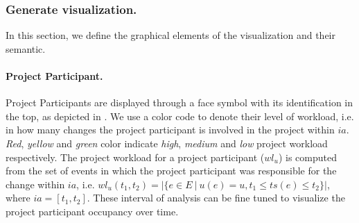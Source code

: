 


\subsubsection{Generate visualization.}
In this section, we define the graphical elements of the visualization and their semantic. 

%
\paragraph{Project Participant.}

Project Participants are displayed through a face symbol with its identification in the top, as depicted in  . We use a color code to denote their level of workload, i.e. in how many changes the project participant is involved in the project within $ia$. \emph{Red}, \emph{yellow} and \emph{green} color indicate \emph{high}, \emph{medium} and \emph{low} project workload respectively. The project workload for a project participant ($wl_u$) is computed from the set of events in which the project participant was responsible for the change within $ia$, i.e. $wl_u(t_1,t_2) = |\lbrace e \in E ~|~  u(e)= u, t_1 \leq ts(e) \leq t_2 \rbrace|$, where $ia=[t_1 , t_2]$. These interval of analysis can be fine tuned to visualize the project participant occupancy over time. 

